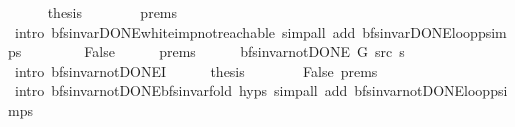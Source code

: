 \begin{isabellebody}
\ \ \ \ \isamarkupfalse%
\ {\isacharquery}{\kern0pt}thesis\isanewline
\ \ \ \ \ \ \isamarkupfalse%
\ {\isachardoublequoteopen}{}{\isachardot}{\kern0pt}prems{\isachardoublequoteclose}{\isacharparenleft}{\kern0pt}{}{\isacharparenright}{\kern0pt}\isanewline
\ \ \ \ \ \ \isamarkupfalse%
\ {\isacharparenleft}{\kern0pt}intro\ bfs{\isacharunderscore}{\kern0pt}invar{\isacharunderscore}{\kern0pt}DONE{\isachardot}{\kern0pt}white{\isacharunderscore}{\kern0pt}imp{\isacharunderscore}{\kern0pt}not{\isacharunderscore}{\kern0pt}reachable{\isacharparenright}{\kern0pt}\ {\isacharparenleft}{\kern0pt}simp{\isacharunderscore}{\kern0pt}all\ add{\isacharcolon}{\kern0pt}\ bfs{\isacharunderscore}{\kern0pt}invar{\isacharunderscore}{\kern0pt}DONE{\isachardot}{\kern0pt}loop{\isacharunderscore}{\kern0pt}psimps{\isacharparenright}{\kern0pt}\isanewline
\ \ \isamarkupfalse%
\isanewline
\ \ \ \ \isamarkupfalse%
\ False\isanewline
\ \ \ \ \isamarkupfalse%
\ {\isachardoublequoteopen}{}{\isachardot}{\kern0pt}prems{\isachardoublequoteclose}{\isacharparenleft}{\kern0pt}{}{\isacharparenright}{\kern0pt}\isanewline
\ \ \ \ \isamarkupfalse%
\ {\isachardoublequoteopen}bfs{\isacharunderscore}{\kern0pt}invar{\isacharunderscore}{\kern0pt}not{\isacharunderscore}{\kern0pt}DONE{\isacharprime}{\kern0pt}\ G\ src\ s{\isachardoublequoteclose}\isanewline
\ \ \ \ \ \ \isamarkupfalse%
\ {\isacharparenleft}{\kern0pt}intro\ bfs{\isacharunderscore}{\kern0pt}invar{\isacharunderscore}{\kern0pt}not{\isacharunderscore}{\kern0pt}DONE{\isacharprime}{\kern0pt}I{\isacharparenright}{\kern0pt}\isanewline
\ \ \ \ \isamarkupfalse%
\ {\isacharquery}{\kern0pt}thesis\isanewline
\ \ \ \ \ \ \isamarkupfalse%
\ False\ {\isachardoublequoteopen}{}{\isachardot}{\kern0pt}prems{\isachardoublequoteclose}{\isacharparenleft}{\kern0pt}{}{\isacharparenright}{\kern0pt}\isanewline
\ \ \ \ \ \ \isamarkupfalse%
\ {\isacharparenleft}{\kern0pt}intro\ bfs{\isacharunderscore}{\kern0pt}invar{\isacharunderscore}{\kern0pt}not{\isacharunderscore}{\kern0pt}DONE{\isachardot}{\kern0pt}bfs{\isacharunderscore}{\kern0pt}invar{\isacharunderscore}{\kern0pt}fold\ {\isachardoublequoteopen}{}{\isachardot}{\kern0pt}hyps{\isachardoublequoteclose}{\isacharparenright}{\kern0pt}\ {\isacharparenleft}{\kern0pt}simp{\isacharunderscore}{\kern0pt}all\ add{\isacharcolon}{\kern0pt}\ bfs{\isacharunderscore}{\kern0pt}invar{\isacharunderscore}{\kern0pt}not{\isacharunderscore}{\kern0pt}DONE{\isachardot}{\kern0pt}loop{\isacharunderscore}{\kern0pt}psimps{\isacharparenright}{\kern0pt}\isanewline

\end{isabellebody}
